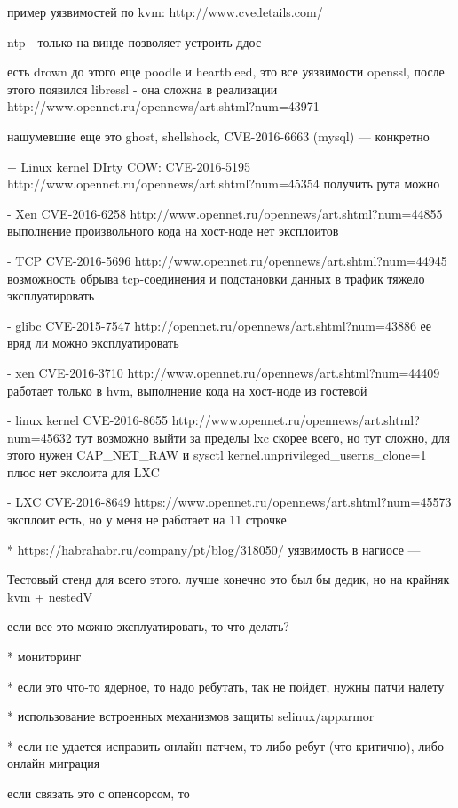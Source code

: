 пример уязвимостей по kvm: http://www.cvedetails.com/

ntp - только на винде позволяет устроить ддос

есть drown до этого еще poodle и heartbleed, это все уязвимости openssl, после этого появился libressl - она сложна в реализации http://www.opennet.ru/opennews/art.shtml?num=43971

нашумевшие еще это ghost, shellshock, CVE-2016-6663 (mysql)
--- конкретно

+ Linux kernel DIrty COW: CVE-2016-5195 http://www.opennet.ru/opennews/art.shtml?num=45354
получить рута можно

- Xen CVE-2016-6258 http://www.opennet.ru/opennews/art.shtml?num=44855
выполнение произвольного кода на хост-ноде
нет эксплоитов

- TCP CVE-2016-5696 http://www.opennet.ru/opennews/art.shtml?num=44945
возможность обрыва tcp-соединения и подстановки данных в трафик
тяжело эксплуатировать

- glibc CVE-2015-7547 http://opennet.ru/opennews/art.shtml?num=43886
ее вряд ли можно эксплуатировать

- xen CVE-2016-3710 http://www.opennet.ru/opennews/art.shtml?num=44409
работает только в hvm, выполнение кода на хост-ноде из гостевой

- linux kernel CVE-2016-8655 http://www.opennet.ru/opennews/art.shtml?num=45632
тут возможно выйти за пределы lxc скорее всего, но тут сложно, для этого нужен CAP\_NET\_RAW и sysctl kernel.unprivileged\_userns\_clone=1 плюс нет экслоита для LXC

- LXC CVE-2016-8649 https://www.opennet.ru/opennews/art.shtml?num=45573
эксплоит есть, но у меня не работает на 11 строчке

* https://habrahabr.ru/company/pt/blog/318050/ уязвимость в нагиосе
---

Тестовый стенд для всего этого.
лучше конечно это был бы дедик, но на крайняк kvm + nestedV

если все это можно эксплуатировать, то что делать?

* мониторинг

* если это что-то ядерное, то надо ребутать, так не пойдет, нужны патчи налету

* использование встроенных механизмов защиты selinux/apparmor

* если не удается исправить онлайн патчем, то либо ребут (что критично), либо онлайн миграция


если связать это с опенсорсом, то


